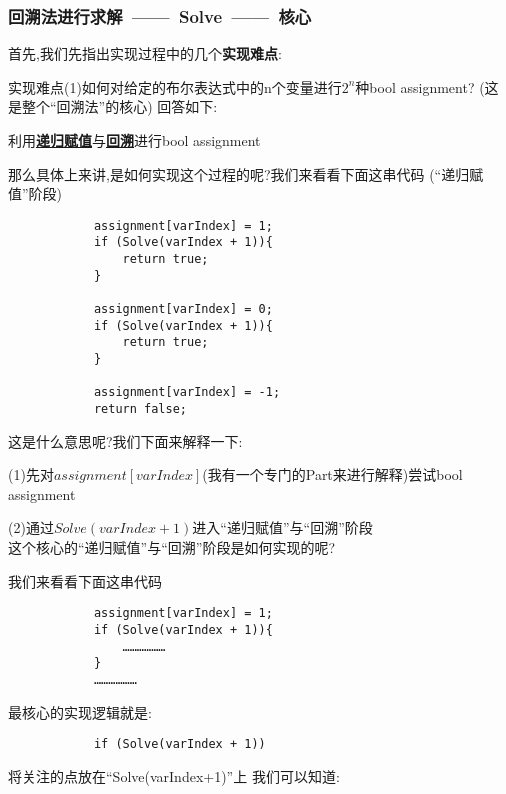         \subsubsection{回溯法进行求解\ ——\ Solve\ ——\ 核心}
        \noindent
        首先,我们先指出实现过程中的几个\textbf{实现难点}:
        \par
        实现难点(1)如何对给定的布尔表达式中的n个变量进行$2^{n}$种bool assignment?
        (这是整个``回溯法''的核心)
        回答如下:
        \begin{center}
            利用\quad \underline{\textbf{递归赋值}}与\underline{\textbf{回溯}}\quad 进行bool assignment
        \end{center}
        \par
        那么具体上来讲,是如何实现这个过程的呢?我们来看看下面这串代码
        (``递归赋值''阶段)
        \begin{lstlisting}
            assignment[varIndex] = 1;
            if (Solve(varIndex + 1)){
                return true;
            }

            assignment[varIndex] = 0;
            if (Solve(varIndex + 1)){
                return true;
            }

            assignment[varIndex] = -1;
            return false;
        \end{lstlisting}
        这是什么意思呢?我们下面来解释一下:\par
        (1)先对$assignment[varIndex]$(我有一个专门的Part来进行解释)尝试bool assignment\par
        (2)通过$Solve(varIndex+1)$进入``递归赋值''与``回溯''阶段\\
        这个核心的``递归赋值''与``回溯''阶段是如何实现的呢?
        \par
        我们来看看下面这串代码
        \begin{lstlisting}
            assignment[varIndex] = 1;
            if (Solve(varIndex + 1)){
                ………………
            }
            ………………
        \end{lstlisting}
        \par
        最核心的实现逻辑就是:
        \begin{lstlisting}
            if (Solve(varIndex + 1))
        \end{lstlisting}
        \par
        将关注的点放在``Solve(varIndex+1)''上
        \newline
        \noindent
        我们可以知道:
        \par

